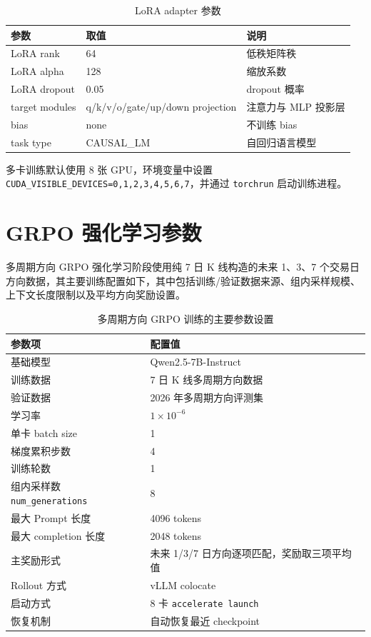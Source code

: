 \begin{table}[htbp]
  \centering
  \caption{LoRA adapter 参数}
  \begin{tabular}{lll}
    \toprule
    参数 & 取值 & 说明 \\
    \midrule
    LoRA rank & 64 & 低秩矩阵秩 \\
    LoRA alpha & 128 & 缩放系数 \\
    LoRA dropout & 0.05 & dropout 概率 \\
    target modules & q/k/v/o/gate/up/down projection & 注意力与 MLP 投影层 \\
    bias & none & 不训练 bias \\
    task type & CAUSAL\_LM & 自回归语言模型 \\
    \bottomrule
  \end{tabular}
\end{table}

多卡训练默认使用 8 张 GPU，环境变量中设置 \texttt{CUDA\_VISIBLE\_DEVICES=0,1,2,3,4,5,6,7}，并通过 \texttt{torchrun} 启动训练进程。

\section{GRPO 强化学习参数}

多周期方向 GRPO 强化学习阶段使用纯 7 日 K 线构造的未来 1、3、7 个交易日方向数据，其主要训练配置如下，其中包括训练/验证数据来源、组内采样规模、上下文长度限制以及平均方向奖励设置。

\begin{table}[htbp]
  \centering
  \caption{多周期方向 GRPO 训练的主要参数设置}
  \begin{tabular}{p{}p{}}
    \toprule
    参数项 & 配置值 \\
    \midrule
    基础模型 & Qwen2.5-7B-Instruct \\
    训练数据 & 7 日 K 线多周期方向数据 \\
    验证数据 & 2026 年多周期方向评测集 \\
    学习率 & \(1\times10^{-6}\) \\
    单卡 batch size & 1 \\
    梯度累积步数 & 4 \\
    训练轮数 & 1 \\
    组内采样数 \texttt{num\_generations} & 8 \\
    最大 Prompt 长度 & 4096 tokens \\
    最大 completion 长度 & 2048 tokens \\
    主奖励形式 & 未来 1/3/7 日方向逐项匹配，奖励取三项平均值 \\
    Rollout 方式 & vLLM colocate \\
    启动方式 & 8 卡 \texttt{accelerate launch} \\
    恢复机制 & 自动恢复最近 checkpoint \\
    \bottomrule
  \end{tabular}
\end{table}

